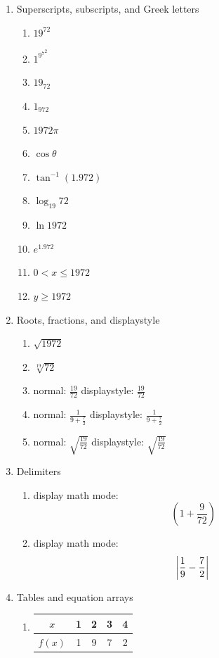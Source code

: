 \documentclass[a4paper,14pt]{article}
\begin{document}
\begin{enumerate}
    \item Superscripts, subscripts, and Greek letters
    \begin{enumerate}
        \item $19^{72}$
        \item $1^{{{{9}^{7}}^{2}}}$
        \item $19_{72}$
        \item $1_{{{9}{7}}{2}}$
        \item $1972{\pi}$
        \item $\cos \theta$
        \item $\tan^{-1}(1.972)$
        \item $\log_{19}72$
        \item $\ln 1972$
        \item $e^{1.972}$
        \item $0 < x \leq 1972$
        \item $y \geq 1972$
    \end{enumerate}

    \item Roots, fractions, and displaystyle
    \begin{enumerate}
        \item $\sqrt{1972}$
        \item $\sqrt[19]{72}$
        \item normal: $\frac{19}{72}$ displaystyle: $\displaystyle \frac{19}{72}$
        \item normal: $\frac{1}{9 + \frac{7}{2}}$ displaystyle: $\displaystyle \frac{1}{9 + \frac{7}{2}}$
        \item normal: $\sqrt{\frac{19}{72}}$ displaystyle: $\displaystyle \sqrt{\frac{19}{72}}$
    \end{enumerate}

    \item Delimiters
    \begin{enumerate}
        \item display math mode:
            \begin{equation}
                (1+\frac{9}{72}) \nonumber
            \end{equation}
        \item display math mode: 
            \begin{equation}
                \left|
                    \frac{1}{9}-\frac{7}{2}\right| \nonumber\\
            \end{equation}
    \end{enumerate}
    \item Tables and equation arrays
    \begin{enumerate}
        \item
        \begin{tabular}{|c|c|c|c|c|}
        \hline
        $x$ & 1 & 2 & 3 & 4 \\
        \hline
        $f(x)$ & 1 & 9 & 7 & 2 \\
        \hline
        \end{tabular}


\end{enumerate}
\end{enumerate}
\end{document}
